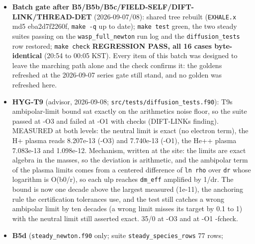 \documentclass[english,a4paper]{my_memo}
\begin{document}
\begin{itemize}
  positive and is what the comment already claimed; \texttt{mol\_diffusion} 300
  steps byte-identical, since at production flags the infinity was clamped
  to the same 0. The \texttt{csm\_max\_pass} comment of \texttt{EXHALE\_main.f90} and
  \texttt{docs/steady\_solver\_design.md} section 15 corrected to the FIELD-SELF and
  B5c measurements. Recorded: \texttt{diffusion\_tests} T9 reads 1.098e-12 against
  its 1e-12 bound at \texttt{-O1\ -fcheck} (an optimization-level rounding
  sensitivity of \texttt{relative\_settling\_mass}, 35/0 at -O3); the outer loop\textquotesingle s
  under-relaxation damps helium only while the drift it tests can now be set
  by a trace element.
\item
  \textbf{Batch gate after B5/B5b/B5c/FIELD-SELF/DIFT-LINK/THREAD-DET}
  (2026-09-07/08): shared tree rebuilt (\texttt{EXHALE.x} md5 eba2d7f2260f,
  \texttt{make\ -q} up to date); \texttt{make\ test} green, the two steady suites passing on
  the \texttt{wasp\_full\_newton} run log and the \texttt{diffusion\_tests} row restored;
  \texttt{make\ check} \textbf{REGRESSION PASS, all 16 cases byte-identical} (20:54 to
  00:05 KST). Every item of this batch was designed to leave the marching
  path alone and the check confirms it: the goldens refreshed at the
  2026-09-07 series gate still stand, and no golden was refreshed here.
\item
  \textbf{HYG-T9} (advisor, 2026-09-08; \texttt{src/tests/diffusion\_tests.f90}): T9\textquotesingle s
  ambipolar-limit bound sat exactly on the arithmetic\textquotesingle s noise floor, so the
  suite passed at -O3 and failed at -O1 with checks (DIFT-LINK\textquotesingle s finding).
  MEASURED at both levels: the neutral limit is exact (no electron term),
  the H+ plasma reads 8.207e-13 (-O3) and 7.740e-13 (-O1), the He++ plasma
  7.083e-13 and 1.098e-12. Mechanism, written at the site: the limits are
  exact algebra in the masses, so the deviation is arithmetic, and the
  ambipolar term of the plasma limits comes from a centered difference of
  \texttt{ln\ rho} over \texttt{dr} whose logarithm is O(b0/r), so each ulp reaches
  \texttt{dm\_eff} amplified by 1/dr. The bound is now one decade above the largest
  measured (1e-11), the anchoring rule the certification tolerances use, and
  the test still catches a wrong ambipolar limit by ten decades (a wrong
  limit misses its target by 0.1 to 1) with the neutral limit still asserted
  exact. 35/0 at -O3 and at -O1 -fcheck.
\item
  \textbf{B5d} (\texttt{steady\_newton.f90} only; suite \texttt{steady\_species\_rows} 77 rows;

\end{itemize}
\end{document}
